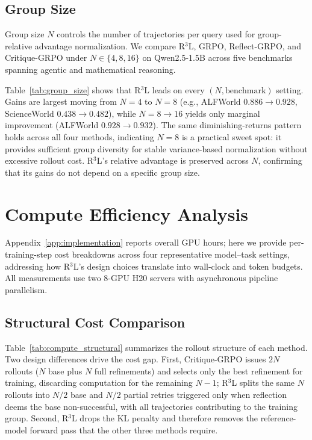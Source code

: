 \documentclass{article} %
\theoremstyle{definition}
\theoremstyle{remark}
\begin{document}
\subsection{Group Size}
\label{sec:group_size}

Group size $N$ controls the number of trajectories per query used for group-relative advantage normalization. We compare R$^3$L, GRPO, Reflect-GRPO, and Critique-GRPO under $N \in \{4, 8, 16\}$ on Qwen2.5-1.5B across five benchmarks spanning agentic and mathematical reasoning.



Table~\ref{tab:group_size} shows that R$^3$L leads on every $(N, \text{benchmark})$ setting. Gains are largest moving from $N=4$ to $N=8$ (e.g., ALFWorld $0.886 \to 0.928$, ScienceWorld $0.438 \to 0.482$), while $N=8 \to 16$ yields only marginal improvement (ALFWorld $0.928 \to 0.932$). The same diminishing-returns pattern holds across all four methods, indicating $N=8$ is a practical sweet spot: it provides sufficient group diversity for stable variance-based normalization without excessive rollout cost. R$^3$L's relative advantage is preserved across $N$, confirming that its gains do not depend on a specific group size.

\section{Compute Efficiency Analysis}
\label{sec:compute}

Appendix~\ref{app:implementation} reports overall GPU hours; here we provide per-training-step cost breakdowns across four representative model--task settings, addressing how R$^3$L's design choices translate into wall-clock and token budgets. All measurements use two 8-GPU H20 servers with asynchronous pipeline parallelism.

\subsection{Structural Cost Comparison}



Table~\ref{tab:compute_structural} summarizes the rollout structure of each method. Two design differences drive the cost gap. First, Critique-GRPO issues $2N$ rollouts ($N$ base plus $N$ full refinements) and selects only the best refinement for training, discarding computation for the remaining $N{-}1$; R$^3$L splits the same $N$ rollouts into $N/2$ base and $N/2$ partial retries triggered only when reflection deems the base non-successful, with all trajectories contributing to the training group. Second, R$^3$L drops the KL penalty and therefore removes the reference-model forward pass that the other three methods require.
\end{document}
